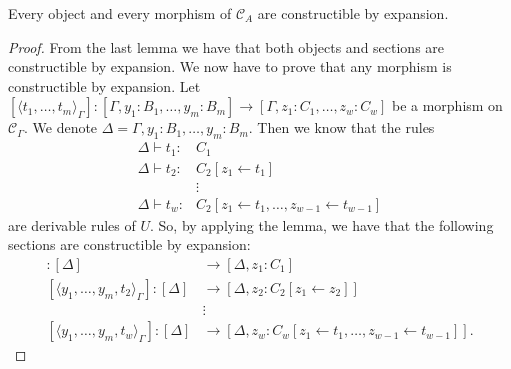 \begin{theorem} \label{thm:exhaustivity-for-gats}
    Every object and every morphism of $\mathcal{C}_A$ are constructible by expansion.
\end{theorem}
\begin{proof} 
    From the last lemma we have that both objects and sections are constructible by expansion.
    We now have to prove that any morphism is constructible by expansion.
    Let $[\langle t_1, \dots, t_m \rangle_\Gamma]: [\Gamma, y_1 \colon B_1, \dots, y_m \colon B_m] \to [\Gamma, z_1 \colon C_1, \dots, z_w \colon C_w]$
    be a morphism on $\mathcal{C}_\Gamma$.  We denote $\Delta = \Gamma, y_1 \colon B_1, \dots, y_m \colon B_m$.
    Then we know that the rules
    \begin{align*}
        \Delta \vdash t_1 \colon& C_1 \\
        \Delta \vdash t_2 \colon& C_2 [z_1  \leftarrow  t_1] \\ 
        & \vdots \\ 
        \Delta \vdash t_w \colon& C_2 [z_1  \leftarrow  t_1, \dots, z_{w-1}  \leftarrow  t_{w-1}]
    \end{align*} 
    are derivable rules of $U$. So, by applying the lemma, we have that the following sections are constructible by expansion: 
    \begin{align*}
        [\langle y_1, \dots, y_m, t_1 \rangle_\Gamma] \colon [\Delta] &\to [\Delta, z_1 \colon C_1] \\
        [\langle y_1, \dots, y_m, t_2 \rangle_\Gamma] \colon [\Delta] &\to [\Delta, z_2 \colon C_2[z_1  \leftarrow  z_2]] \\
        & \vdots \\
        [\langle y_1, \dots, y_m, t_w \rangle_\Gamma] \colon [\Delta] &\to [\Delta, z_w \colon C_w[z_1  \leftarrow  t_1, \dots, z_{w-1}  \leftarrow  t_{w-1}]].
    \end{align*} 


\end{proof}
